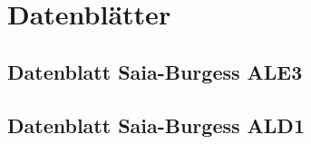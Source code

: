 \documentclass[Bachelorarbeit.tex]{subfiles}
\begin{document}
\chapter{Datenblätter}
\newpage

\section{Datenblatt Saia-Burgess ALE3}
\label{sec:datenblatt_ale3}
 
\newpage

\section{Datenblatt Saia-Burgess ALD1}
\label{sec:datenblatt_ald1}
 
\end{document}
